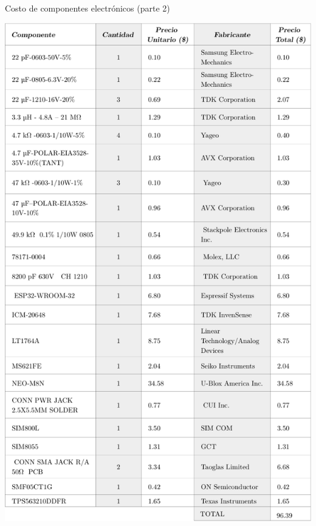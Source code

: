 \begin{table}[htbp!]
  \centering
  \caption{Costo de componentes electrónicos (parte 2)}
  \label{diag:costos_elec_2}
  \includegraphics[width=0.9\linewidth]{BOM_2.pdf}
\end{table}

